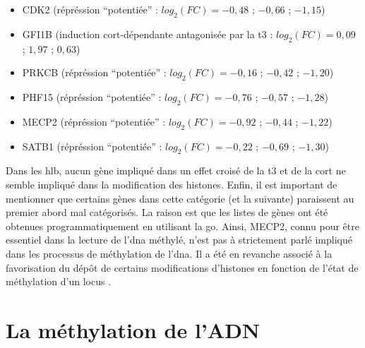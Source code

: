 \documentclass[../main.tex]{subfiles}
\begin{document}
	\begin{itemize}
	\item CDK2 (répréssion ``potentiée'' : $log_2(FC)=-0,48$ ; $-0,66$ ; $-1,15$)
	\item GFI1B (induction \gls{cort}-dépendante antagonisée par la \gls{t3} : $log_2(FC)=0,09$ ; $1,97$ ; $0,63$)
	\item PRKCB (répréssion ``potentiée'' : $log_2(FC)=-0,16$ ; $-0,42$ ; $-1,20$)
	\item PHF15 (répréssion ``potentiée'' : $log_2(FC)=-0,76$ ; $-0,57$ ; $-1,28$)
	\item MECP2 (répréssion ``potentiée'' : $log_2(FC)=-0,92$ ; $-0,44$ ; $-1,22$)
	\item SATB1 (répréssion ``potentiée'' : $log_2(FC)=-0,22$ ; $-0,69$ ; $-1,30$)
	\end{itemize}
	Dans les \gls{hlb}, aucun gène impliqué dans un effet croisé de la \gls{t3} et de la \gls{cort} ne semble impliqué dans la modification des histones.
	Enfin, il est important de mentionner que certains gènes dans cette catégorie (et la suivante) paraissent au premier abord mal catégorisés.
	La raison est que les listes de gènes ont été obtenues programmatiquement en utilisant la \gls{go}.
	Ainsi, MECP2, connu pour être essentiel dans la lecture de l'\gls{dna} méthylé, n'est pas à strictement parlé impliqué dans les processus de méthylation de l'\gls{dna}.
	Il a été en revanche associé à la favorisation du dépôt de certains modifications d'histones en fonction de l'état de méthylation d'un locus \citep{Fuks2003}.

	


\section{La méthylation de l'ADN}
\end{document}
